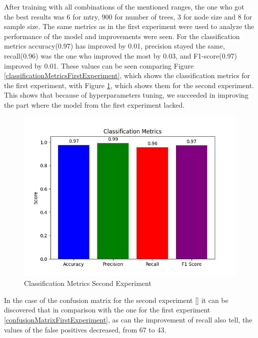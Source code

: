 After training with all combinations of the mentioned ranges, the one who got the best results was 6 for mtry, 900 for number of trees, 3 for node size and 8 for sample size. The same metrics as in the first experiment were used to analyze the performance of the model and improvements were seen. For the classification metrics accuracy(0.97) has improved by 0.01, precision stayed the same, recall(0.96) was the one who improved the most by 0.03, and F1-score(0.97) improved by 0.01. These values can be seen comparing Figure \ref{classificationMetricsFirstExperiment}, which shows the classification metrics for the first experiment, with Figure \ref{classificationMetricsSecondExperiment}, which shows them for the second experiment. This shows that because of hyperparameters tuning, we succeeded in improving the part where the model from the first experiment lacked.

\begin{figure}[htbp]
	\centering
		\includegraphics[scale=0.8]{LaTeX Bachelor Thesis Depression Signs Detection/figures/metrics/experiment2English/classificationMetrics.jpg}
	\caption{Classification Metrics Second Experiment}
	\label{classificationMetricsSecondExperiment}
\end{figure}

In the case of the confusion matrix for the second experiment \ref{} it can be discovered that in comparison with the one for the first experiment \ref{confusionMatrixFirstExperiment}, as can the improvement of recall also tell, the values of the false positives decreased, from 67 to 43.

